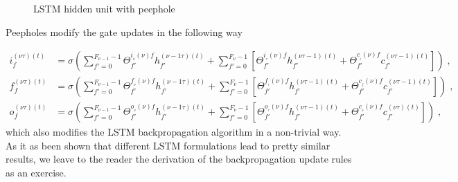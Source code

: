 \begin{subappendices}
\begin{figure}[H]
\begin{center}
\caption{\label{fig:peepholeLSTM}LSTM hidden unit with peephole}
\end{center}
\end{figure}

Peepholes modify the gate updates in the following way

\begin{align}
i^{(\nu\tau)(t)}_f&=\sigma\left(\sum_{f'=0}^{F_{{\nu-1}}-1}\Theta^{i_{_\nu}(\nu)f}_{f'}
%
h^{(\nu-1\tau)(t)}_{f'}+\sum_{f'=0}^{F{_{\nu}}-1}\left[\Theta^{i_{_\tau}(\nu)f}_{f'}
%
h^{(\nu\tau-1)(t)}_{f'}+\Theta^{c_{_i}(\nu)f}_{f'}c^{(\nu\tau-1)(t)}_{f'}\right]\right)\;,\\
%
f^{(\nu\tau)(t)}_f&=\sigma\left(\sum_{f'=0}^{F{_{\nu-1}}-1}\Theta^{f_{_\nu}(\nu)f}_{f'}
%
h^{(\nu-1\tau)(t)}_{f'}+\sum_{f'=0}^{F_{{\nu}}-1}\left[\Theta^{f_{_\tau}(\nu)f}_{f'}
%
h^{(\nu\tau-1)(t)}_{f'}+\Theta^{c_{_f}(\nu)f}_{f'}c^{(\nu\tau-1)(t)}_{f'}\right]\right)\;,\\
%
o^{(\nu\tau)(t)}_f&=\sigma\left(\sum_{f'=0}^{F_{{\nu-1}}-1}\Theta^{o_{_\nu}(\nu)f}_{f'}
%
h^{(\nu-1\tau)(t)}_{f'}+\sum_{f'=0}^{F_{{\nu}}-1}\left[\Theta^{o_{_\tau}(\nu)f}_{f'}
%
h^{(\nu\tau-1)(t)}_{f'}+\Theta^{c_{_o}(\nu)f}_{f'}c^{(\nu\tau)(t)}_{f'}\right]\right)\;,
\end{align}
which also modifies the LSTM backpropagation algorithm in a non-trivial way. As it as been shown that different LSTM formulations lead to pretty similar results, we leave to the reader the derivation of the backpropagation update rules as an exercise.

\end{subappendices}
